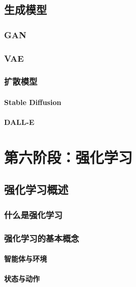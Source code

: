 \documentclass[12pt,UTF8]{ctexbook}
\begin{document}
\chapter{生成模型}
\label{chap:generative_models}

\section{GAN}

\section{VAE}

\section{扩散模型}

\subsection{Stable Diffusion}

\subsection{DALL-E}

\part{第六阶段：强化学习}

\chapter{强化学习概述}
\label{chap:rl_overview}

\section{什么是强化学习}

\section{强化学习的基本概念}

\subsection{智能体与环境}

\subsection{状态与动作}
\end{document}
